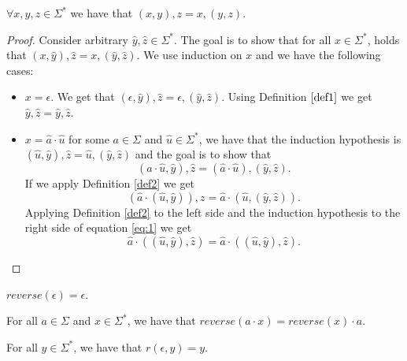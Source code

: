 \begin{theorem}$\forall x,y,z \in \Sigma^*$ we have that $(x,y),z = x,(y,z)$.
    \label{t:assoc}
\end{theorem}
\begin{proof} Consider arbitrary $\hat{y}, \hat{z} \in \Sigma^*$. The goal is to show that for all $x \in \Sigma^*$, holds that $(x, \hat{y}),\hat{z} = x , (\hat{y}, \hat{z})$. We use induction on $x$ and we have the following cases:
    \begin{itemize}
        \item \textbf{$x = \epsilon$}. We get that $(\epsilon, \hat{y}), \hat{z} = \epsilon, (\hat{y}, \hat{z})$. Using Definition $\ref{def1}$ we get $\hat{y},\hat{z} = \hat{y},\hat{z}$.
        \item \textbf{$x = \hat{a}\cdot \hat{u}$} for some $a \in \Sigma$ and $\hat{u} \in \Sigma^*$, we have that the induction hypothesis is $(\hat{u}, \hat{y}), \hat{z} = \hat{u},(\hat{y}, \hat{z})$ and the goal is to show that 
        \begin{equation}
            (\hat{a}\cdot \hat{u}, \hat{y}), \hat{z} = (\hat{a} \cdot \hat{u}), (\hat{y}, \hat{z}).
        \end{equation}  
        If we apply Definition \ref{def2} we get
        \begin{equation}
            (\hat{a}\cdot (\hat{u}, \hat{y})), z = \hat{a}\cdot(\hat{u}, (\hat{y}, \hat{z})).
            \label{eq:1}
        \end{equation}
        Applying Definition \ref{def2} to the left side and the induction hypothesis to the right side of equation \ref{eq:1} we get
        \begin{equation}
            \hat{a} \cdot ((\hat{u}, \hat{y}), \hat{z}) = \hat{a} \cdot ((\hat{u}, \hat{y}), \hat{z}). 
        \end{equation}
    \end{itemize}
\end{proof}

\begin{definition}$reverse(\epsilon) = \epsilon$.
    \label{def:rev1}
\end{definition}
\begin{definition}For all $a \in \Sigma$ and $x \in \Sigma^*$, we have that $reverse(a\cdot x) = reverse(x)\cdot a$.
    \label{def:rev2}
\end{definition}

\begin{definition} For all $y\in \Sigma^*$, we have that $r(\epsilon, y) = y$.
    \label{def:r1}
\end{definition}

